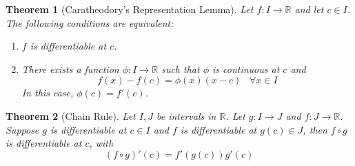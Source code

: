 \documentclass[12pt]{article}
\newtheorem{theorem}{Theorem}[section]
\theoremstyle{definition}
\begin{document}
\begin{theorem}[Caratheodory's Representation Lemma]
\normalfont Let $f:I\to\mathbb{R}$ and let $c\in I$. The following conditions are equivalent:
\begin{enumerate}
	\item $f$ is differentiable at $c$.
	\item There exists a function $\phi:I\to\mathbb{R}$ such that $\phi$ is continuous at $c$ and
	\[
f(x)-f(c)=\phi(x)(x-c)\;\;\;\forall x\in I
	\]
	In this case, $\phi(c) = f'(c)$.
\end{enumerate}
\end{theorem}
\begin{theorem}[Chain Rule]
\normalfont Let $I,J$ be intervals in $\mathbb{R}$. Let $g:I\to J$ and $f:J\to \mathbb{R}$. Suppose $g$ is differentiable at $c\in I$ and $f$ is differentiable at $g(c)\in J$, then $f\circ g$ is differentiable at $c$, with
\[
(f\circ g)'(c)=f'(g(c))g'(c)
\]
\end{theorem}
\end{document}
